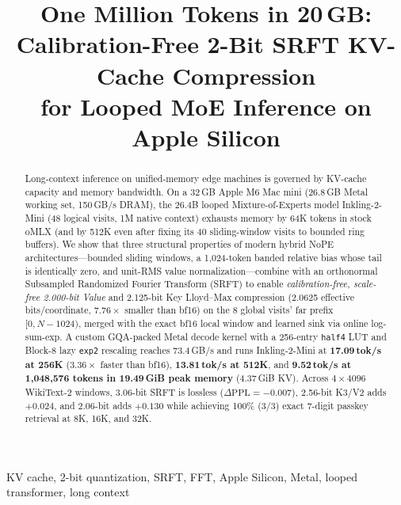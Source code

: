 \documentclass[conference]{IEEEtran}
\newcommand{\dPPL}{\Delta\mathrm{PPL}}
\begin{document}

\title{One Million Tokens in 20\,GB:\\Calibration-Free 2-Bit SRFT KV-Cache Compression\\for Looped MoE Inference on Apple Silicon}

\author{
}

\maketitle

\begin{abstract}
Long-context inference on unified-memory edge machines is governed by KV-cache capacity and memory bandwidth. On a 32\,GB Apple M6 Mac mini (26.8\,GB Metal working set, 150\,GB/s DRAM), the 26.4B looped Mixture-of-Experts model Inkling-2-Mini (48 logical visits, 1M native context) exhausts memory by 64K tokens in stock oMLX (and by 512K even after fixing its 40 sliding-window visits to bounded ring buffers). We show that three structural properties of modern hybrid NoPE architectures—bounded sliding windows, a 1{,}024-token banded relative bias whose tail is identically zero, and unit-RMS value normalization—combine with an orthonormal Subsampled Randomized Fourier Transform (SRFT) to enable \emph{calibration-free, scale-free 2.000-bit Value} and 2.125-bit Key Lloyd--Max compression (2.0625 effective bits/coordinate, $7.76\times$ smaller than bf16) on the 8 global visits' far prefix $[0, N-1024)$, merged with the exact bf16 local window and learned sink via online log-sum-exp. A custom GQA-packed Metal decode kernel with a 256-entry \texttt{half4} LUT and Block-8 lazy \texttt{exp2} rescaling reaches 73.4\,GB/s and runs Inkling-2-Mini at \textbf{17.09\,tok/s at 256K} ($3.36\times$ faster than bf16), \textbf{13.81\,tok/s at 512K}, and \textbf{9.52\,tok/s at 1{,}048{,}576 tokens in 19.49\,GiB peak memory} (4.37\,GiB KV). Across $4\times 4096$ WikiText-2 windows, 3.06-bit SRFT is lossless ($\dPPL=-0.007$), 2.56-bit K3/V2 adds $+0.024$, and 2.06-bit adds $+0.130$ while achieving 100\% (3/3) exact 7-digit passkey retrieval at 8K, 16K, and 32K.
\end{abstract}

\begin{IEEEkeywords}
KV cache, 2-bit quantization, SRFT, FFT, Apple Silicon, Metal, looped transformer, long context
\end{IEEEkeywords}
\end{document}
